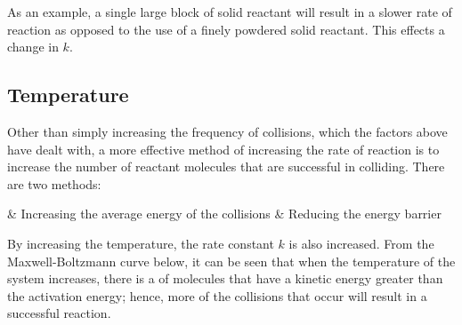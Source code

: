 			As an example, a single large block of solid reactant will result in a slower rate of reaction as opposed to the use of a
			finely powdered solid reactant. This effects a change in $k$.



		\pagebreak
		\subsection{Temperature}

			Other than simply increasing the frequency of collisions, which the factors above have dealt with, a more effective method of
			increasing the rate of reaction is to increase the number of reactant molecules that are successful in colliding. There are two methods:

			\begin{bulletlist}
				& Increasing the average energy of the collisions
				& Reducing the energy barrier
			\end{bulletlist}

			By increasing the temperature, the rate constant $k$ is also increased. From the Maxwell-Boltzmann curve below, it can be seen that
			when the temperature of the system increases, there is a  of molecules that have a kinetic energy greater
			than the activation energy; hence, more of the collisions that occur will result in a successful reaction.


